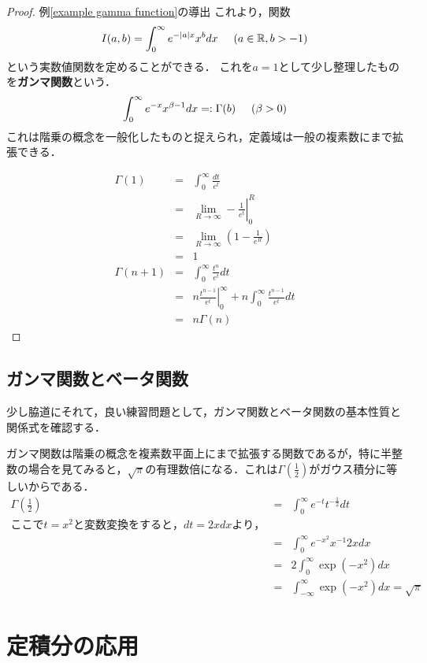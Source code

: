 \documentclass[uplatex, dvipdfmx]{jsreport}
\begin{document}
\begin{proof}{例\ref{example gamma function}の導出}
    これより，関数$$I(a,b)=\int^\infty_0 e^{-|a|x}x^bdx\hspace{5mm}(a\in\mathbb{R}, b>-1)$$という実数値関数を定めることができる．
    これを$a=1$として少し整理したものを\textbf{ガンマ関数}という．
    $$\int^\infty_0 e^{-x}x^{\beta -1}dx=:\Gamma (b) \hspace{5mm}(\beta >0)$$
    これは階乗の概念を一般化したものと捉えられ，定義域は一般の複素数にまで拡張できる．
    
    \begin{eqnarray*}
        \Gamma (1) &=& \int^\infty_0 \frac{dt}{e^t}\\
        &=&  \left. \lim_{R\to\infty}-\frac{1}{e^t}\right|^R_0\\
        &=&  \lim_{R\to\infty}\left(1-\frac{1}{e^R}\right)\\
        &=& 1\\
        \Gamma (n+1) &=& \int^\infty_0\frac{t^n}{e^t}dt \\
        &=& \left. n\frac{t^{n-1}}{e^t}\right|^\infty_0 + n\int^\infty_0\frac{t^{n-1}}{e^t}dt\\
        &=& n\Gamma (n)
    \end{eqnarray*}
\end{proof}

\subsection{ガンマ関数とベータ関数}
少し脇道にそれて，良い練習問題として，ガンマ関数とベータ関数の基本性質と関係式を確認する．

ガンマ関数は階乗の概念を複素数平面上にまで拡張する関数であるが，特に半整数の場合を見てみると，$\sqrt{\pi}$の有理数倍になる．これは$\Gamma (\frac{1}{2})$がガウス積分に等しいからである．
\begin{eqnarray*}
    \Gamma (\frac{1}{2}) &=& \int^\infty_0e^{-t}t^{-\frac{1}{2}}dt \\
    ここでt=x^2と変数変換をすると，dt=2xdxより，\\
    &=& \int^\infty_0 e^{-x^2}x^{-1}2xdx \\
    &=& 2\int^\infty_0 \exp(-x^2)dx\\
    &=& \int^\infty_{-\infty} \exp(-x^2)dx = \sqrt{\pi}
\end{eqnarray*}

\section{定積分の応用}
\end{document}
